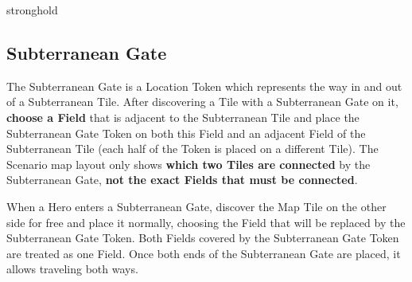 \begin{multicols*}{2}
\begin{expansion}{stronghold}
\bigskip
\begin{center}
  \begin{scriptsize}
    \centering
  \end{scriptsize}
\end{center}

\subsection*{Subterranean Gate}
The Subterranean Gate is a Location Token which represents the way in and out of a Subterranean Tile.
After discovering a Tile with a Subterranean Gate on it, \textbf{choose a Field} that is adjacent to the Subterranean Tile and place the Subterranean Gate Token on both this Field and an adjacent Field of the Subterranean Tile (each half of the Token is placed on a different Tile).
The Scenario map layout only shows \textbf{which two Tiles are connected} by the Subterranean Gate, \textbf{not the exact Fields that must be connected}.\par
When a Hero enters a Subterranean Gate, discover the Map Tile on the other side for free and place it normally, choosing the Field that will be replaced by the Subterranean Gate Token.
Both Fields covered by the Subterranean Gate Token are treated as one Field.
Once both ends of the Subterranean Gate are placed, it allows traveling both ways.
\end{expansion}


\end{multicols*}
